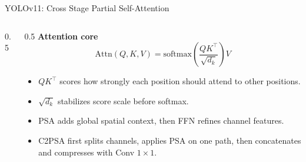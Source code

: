 \documentclass[aspectratio=169]{beamer}
\begin{document}
\begin{frame}{YOLOv11: Cross Stage Partial Self-Attention}
\begin{columns}[T]
\begin{column}{0.5\textwidth}
    \end{column}
    \begin{column}{0.5\textwidth}
      \small
      \textbf{Attention core}
      \[
        \mathrm{Attn}(Q,K,V)=
        \mathrm{softmax}\!\left(
        \frac{QK^\top}{\sqrt{d_k}}
        \right)V
      \]
      \begin{itemize}
        \item $QK^\top$ scores how strongly each position should attend to other positions.
        \item $\sqrt{d_k}$ stabilizes score scale before softmax.
        \item PSA adds global spatial context, then FFN refines channel features.
        \item C2PSA first splits channels, applies PSA on one path, then concatenates and compresses with Conv $1{\times}1$.
      \end{itemize}
    \end{column}
  \end{columns}
\end{frame}
\end{document}
